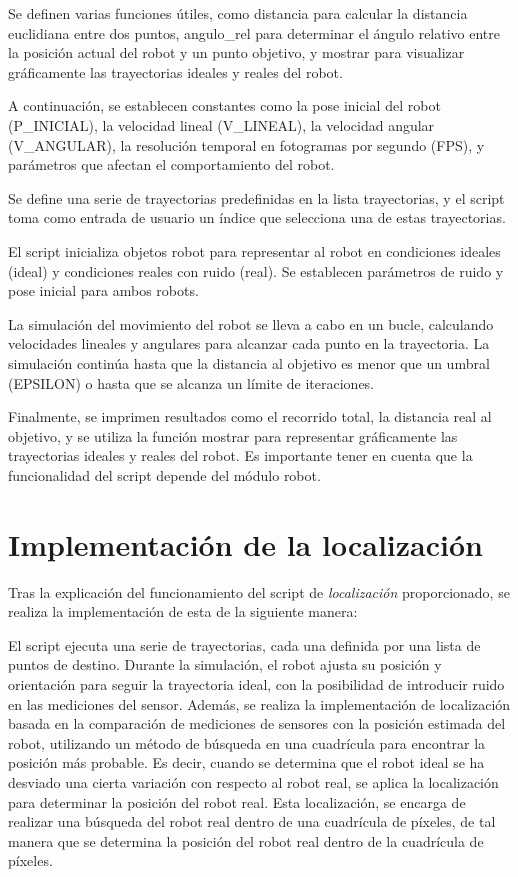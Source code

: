 \documentclass[11pt]{report}
\begin{document}
Se definen varias funciones útiles, como distancia para calcular la distancia euclidiana entre dos puntos, angulo\_rel  para determinar el ángulo relativo entre la posición actual del robot y un punto objetivo, y mostrar para visualizar gráficamente las trayectorias ideales y reales del robot.

A continuación, se establecen constantes como la pose inicial del robot (P\_INICIAL), la velocidad lineal (V\_LINEAL), la velocidad angular (V\_ANGULAR), la resolución temporal en fotogramas por segundo (FPS), y parámetros que afectan el comportamiento del robot.

Se define una serie de trayectorias predefinidas en la lista trayectorias, y el script toma como entrada de usuario un índice que selecciona una de estas trayectorias.

El script inicializa objetos robot para representar al robot en condiciones ideales (ideal) y condiciones reales con ruido (real). Se establecen parámetros de ruido y pose inicial para ambos robots.

La simulación del movimiento del robot se lleva a cabo en un bucle, calculando velocidades lineales y angulares para alcanzar cada punto en la trayectoria. La simulación continúa hasta que la distancia al objetivo es menor que un umbral (EPSILON) o hasta que se alcanza un límite de iteraciones.

Finalmente, se imprimen resultados como el recorrido total, la distancia real al objetivo, y se utiliza la función mostrar para representar gráficamente las trayectorias ideales y reales del robot. Es importante tener en cuenta que la funcionalidad del script depende del módulo robot.

\section{Implementación de la localización}

Tras la explicación del funcionamiento del script de \emph{localización} proporcionado, se realiza la implementación de esta de la siguiente manera:



El script ejecuta una serie de trayectorias, cada una definida por una lista de puntos de destino. Durante la simulación, el robot ajusta su posición y orientación para seguir la trayectoria ideal, con la posibilidad de introducir ruido en las mediciones del sensor. Además, se realiza la implementación de localización basada en la comparación de mediciones de sensores con la posición estimada del robot, utilizando un método de búsqueda en una cuadrícula para encontrar la posición más probable. Es decir, cuando se determina que el robot ideal se ha desviado una cierta variación con respecto al robot real, se aplica la localización para determinar la posición del robot real. Esta localización, se encarga de realizar una búsqueda del robot real dentro de una cuadrícula de píxeles, de tal manera que se determina la posición del robot real dentro de la cuadrícula de píxeles.
\end{document}
